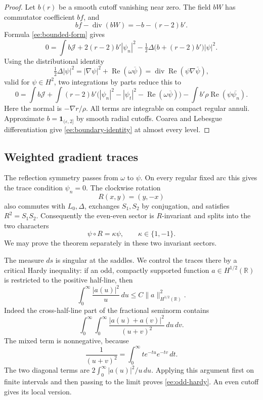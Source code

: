 \documentclass[reqno,11pt]{amsart}
\numberwithin{equation}{section}
\theoremstyle{remark}
\begin{document}
\begin{proof}
Let $b(r)$ be a smooth cutoff vanishing near zero. The field $bW$
has commutator coefficient $bf$, and
\[
 bf-\operatorname{div}(bW)=-b-(r-2)b'.
\]
Formula \eqref{ee:bounded-form} gives
\[
 0=\int b\mathcal J+2(r-2)b'|\psi_n|^2
                       -\tfrac12\Delta\bigl(b+(r-2)b'\bigr)|\psi|^2.
\]
Using the distributional identity
\[
 \tfrac12\Delta|\psi|^2
 =|\nabla\psi|^2+\operatorname{Re}(\omega\overline\psi)
 =\operatorname{div}\operatorname{Re}(\psi\nabla\overline\psi),
\]
valid for $\psi\in H^2$, two integrations by parts reduce this to
\[
 0=\int b\mathcal J
   +\int(r-2)b'\bigl(|\psi_n|^2-|\psi_t|^2
                           -\operatorname{Re}(\omega\overline\psi)\bigr)
   -\int b'\rho\operatorname{Re}(\psi\overline{\psi_n}).
\]
Here the normal is $-\nabla r/\rho$. All terms are integrable on
compact regular annuli. Approximate
$b=\mathbf1_{(\varepsilon,2]}$ by smooth radial cutoffs.
Coarea and Lebesgue differentiation give
\eqref{ee:boundary-identity} at almost every level.
\end{proof}

\subsection{Weighted gradient traces}

The reflection symmetry passes from $\omega$ to $\psi$. On every
regular fixed arc this gives the trace condition $\psi_n=0$.
The clockwise rotation
\[
 R(x,y)=(y,-x)
\]
also commutes with $L_0,\Delta$, exchanges $S_1,S_2$ by conjugation,
and satisfies $R^2=S_1S_2$. Consequently the even-even sector is
$R$-invariant and splits into the two characters
\begin{equation}\label{ee:rotation-character}
 \psi\circ R=\kappa\psi,\qquad \kappa\in\{1,-1\}.
\end{equation}
We may prove the theorem separately in these two invariant sectors.

The measure $ds$ is singular at the saddles. We control the traces
there by a critical Hardy inequality: if an odd, compactly supported function
$a\in H^{1/2}(\mathbb R)$ is restricted to the positive half-line,
then
\begin{equation}\label{ee:odd-hardy}
 \int_0^\infty\frac{|a(u)|^2}{u}\,du
       \le C\|a\|_{H^{1/2}(\mathbb R)}^2.
\end{equation}
Indeed the cross-half-line part of the fractional seminorm contains
\[
 \int_0^\infty\!\int_0^\infty
       \frac{|a(u)+a(v)|^2}{(u+v)^2}\,du\,dv.
\]
The mixed term is nonnegative, because
\[
 \frac1{(u+v)^2}=\int_0^\infty t e^{-tu}e^{-tv}\,dt.
\]
The two diagonal terms are
$2\int_0^\infty |a(u)|^2/u\,du$. Applying this argument first on
finite intervals and then passing to the limit proves
\eqref{ee:odd-hardy}. An even cutoff gives its local version.
\end{document}

